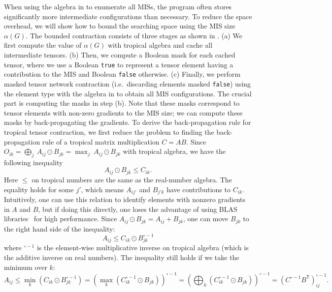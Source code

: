 \documentclass[review, onefignum, onetabnum]{siamart190516}
\begin{document}
When using the algebra in  to enumerate all MISs, the program often stores significantly more intermediate configurations than necessary.
To reduce the space overhead, we will show how to bound the searching space using the MIS size $\alpha(G)$.
The bounded contraction consists of three stages as shown in . (a) We first compute the value of $\alpha(G)$ with tropical algebra and cache all intermediate tensors.
(b) Then, we compute a Boolean mask for each cached tensor, where we use a Boolean \texttt{true} to represent a tensor element having a contribution to the MIS and Boolean \texttt{false} otherwise.
(c) Finally, we perform masked tensor network contraction (i.e.\ discarding elements masked \texttt{false}) using the element type with the algebra in  to obtain all MIS configurations.
The crucial part is computing the masks in step (b). Note that these masks correspond to tensor elements with non-zero gradients to the MIS size; we can compute these masks by back-propagating the gradients.
To derive the back-propagation rule for tropical tensor contraction,
we first reduce the problem to finding the back-propagation rule of a tropical matrix multiplication $C = A B$.
Since $ O_{ik} = \bigoplus_{j} \ A_{ij} \odot B_{jk} = \max_{j} \ A_{ij} \odot B_{jk}$ with tropical algebra, we have the following inequality
\begin{equation}
    A_{ij} \odot B_{jk} \leq C_{ik}.
\end{equation}
Here $\leq$ on tropical numbers are the same as the real-number algebra.
The equality holds for some $j'$, which means $A_{ij'}$ and $B_{j'k}$ have contributions to $C_{ik}$.
Intuitively, one can use this relation to identify elements with nonzero gradients in $A$ and $B$,
but if doing this directly, one loses the advantage of using BLAS libraries~\cite{TropicalGEMM} for high performance.
Since $A_{ij} \odot B_{jk} = A_{ij} + B_{jk}$, one can move $B_{jk}$ to the right hand side of the inequality: 
\begin{equation}
    A_{ij} \leq C_{ik} \odot B_{jk}^{\circ -1}
\end{equation}
where ${}^{\circ -1}$ is the element-wise multiplicative inverse on tropical algebra (which is the additive inverse on real numbers).
The inequality still holds if we take the minimum over $k$: 
\begin{equation}
    A_{ij} \leq \min_{k}(C_{ik} \odot B_{jk}^{\circ -1}) = \left(\max_{k} \left(C_{ik}^{\circ -1} \odot B_{jk} \right) \right)^{\circ -1} = \left(\bigoplus_{k} \left(C_{ik}^{\circ -1} \odot B_{jk} \right) \right)^{\circ -1} = \left( C^{\circ-1} B^{\mathsf{T}} \right)^{\circ -1}_{ij}.
\end{equation}
\end{document}
